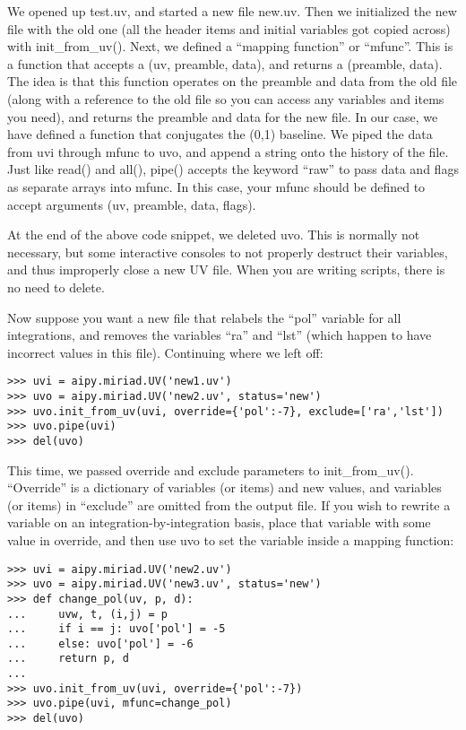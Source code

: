 We opened up test.uv, and started a new file new.uv.  Then we initialized
the new file with the old one (all the header items and initial variables got
copied across) with init\_from\_uv().  Next, we defined a ``mapping function'' 
or ``mfunc''.  This is a function
that accepts a (uv, preamble, data), and returns a (preamble, data).  The
idea is that this function operates on the preamble and data from the old
file (along with a reference to the old file so you can access any variables
and items you need), and returns the preamble and data for the new file.  In
our case, we have defined a function that conjugates the (0,1) baseline.
We piped the data from uvi through mfunc to uvo, and append a string
onto the history of the file.  Just like read() and all(), pipe() accepts
the keyword ``raw'' to pass data and flags as separate arrays into mfunc.  In
this case, your mfunc should be defined to accept arguments 
(uv, preamble, data, flags).

At the end of the above code snippet, we deleted uvo.  This is normally
not necessary, but some interactive consoles to not properly destruct their
variables, and thus improperly close a new UV file.  When you are writing
scripts, there is no need to delete.

Now suppose you want a new file that relabels the ``pol'' variable for all
integrations, and removes the variables ``ra'' and ``lst'' (which happen to
have incorrect values in this file).  Continuing where we left off:

\begin{verbatim}
>>> uvi = aipy.miriad.UV('new1.uv')
>>> uvo = aipy.miriad.UV('new2.uv', status='new')
>>> uvo.init_from_uv(uvi, override={'pol':-7}, exclude=['ra','lst'])
>>> uvo.pipe(uvi)
>>> del(uvo)
\end{verbatim}

This time, we passed override and exclude parameters to init\_from\_uv().
``Override'' is a dictionary of variables (or items) and new values, and
variables (or items) in ``exclude'' are omitted from the output file.  If you 
wish
to rewrite a variable on an integration-by-integration basis, place
that variable with some value in override, and then use uvo to set the variable
inside a mapping function:

\begin{verbatim}
>>> uvi = aipy.miriad.UV('new2.uv')
>>> uvo = aipy.miriad.UV('new3.uv', status='new')
>>> def change_pol(uv, p, d):
...     uvw, t, (i,j) = p
...     if i == j: uvo['pol'] = -5
...     else: uvo['pol'] = -6
...     return p, d
... 
>>> uvo.init_from_uv(uvi, override={'pol':-7})
>>> uvo.pipe(uvi, mfunc=change_pol)
>>> del(uvo)
\end{verbatim}

